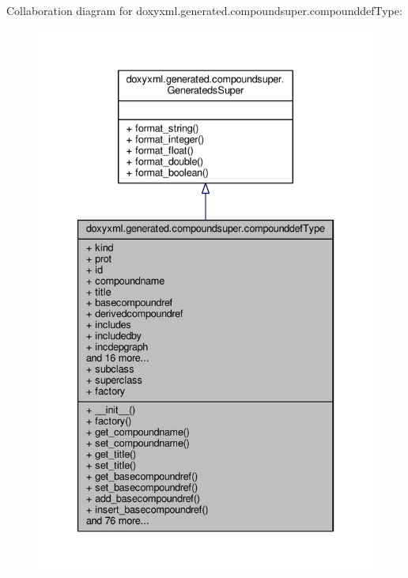Collaboration diagram for doxyxml.\+generated.\+compoundsuper.\+compounddef\+Type\+:
\nopagebreak
\begin{figure}[H]
\begin{center}
\leavevmode
\includegraphics[width=334pt]{df/d54/classdoxyxml_1_1generated_1_1compoundsuper_1_1compounddefType__coll__graph}
\end{center}
\end{figure}
